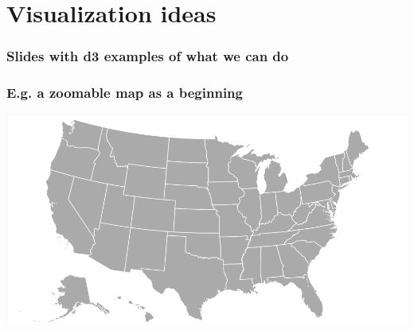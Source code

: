 
\section{Visualization ideas}

  \begin{frame}
    \frametitle{Slides with d3 examples of what we can do}


  \end{frame}


  \begin{frame}
    \frametitle{E.g. a zoomable map as a beginning}
    
    \includegraphics[width=\textwidth]{Figures/zoomable_map.png}


  \end{frame}



